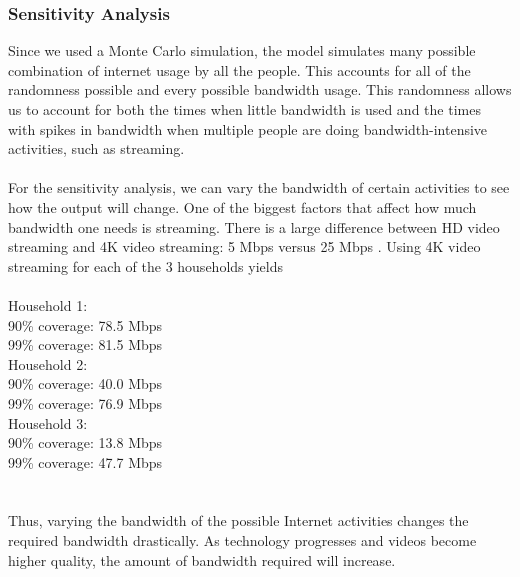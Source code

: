 \documentclass[12pt]{article}
\begin{document}
\subsubsection{Sensitivity Analysis}
Since we used a Monte Carlo simulation, the model simulates many possible combination of internet usage by all the people. This accounts for all of the randomness possible and every possible bandwidth usage. This randomness allows us to account for both the times when little bandwidth is used and the times with spikes in bandwidth when multiple people are doing bandwidth-intensive activities, such as streaming.
\\
\\
For the sensitivity analysis, we can vary the bandwidth of certain activities to see how the output will change. One of the biggest factors that affect how much bandwidth one needs is streaming. There is a large difference between HD video streaming and 4K video streaming: 5 Mbps versus 25 Mbps \cite{m3}. Using 4K video streaming for each of the 3 households yields
\\
\\
Household 1:\\
90\% coverage:  78.5 Mbps\\
99\% coverage:  81.5 Mbps\\

Household 2:\\
90\% coverage:  40.0 Mbps\\
99\% coverage:  76.9 Mbps\\

Household 3:\\
90\% coverage:  13.8 Mbps\\
99\% coverage:  47.7 Mbps\\
\\
\\
Thus, varying the bandwidth of the possible Internet activities changes the required bandwidth drastically. As technology progresses and videos become higher quality, the amount of bandwidth required will increase.
\end{document}
